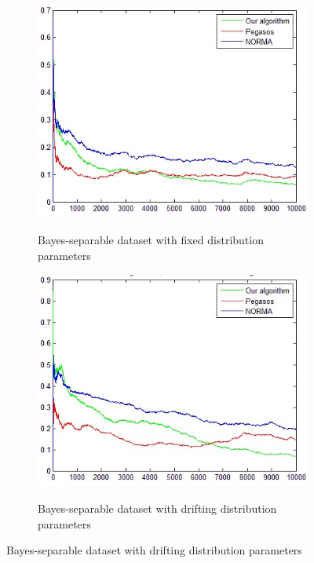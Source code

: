 \begin{figure}[t]
 \begin{subfigure}[c]{.45\linewidth}
	   \includegraphics[width=0.9\linewidth]{PN_Bayess_Gauss}
           \label{BG}
           \caption{Bayes-separable dataset with fixed distribution parameters}
 \end{subfigure}%
\hspace{.01\linewidth}
\begin{subfigure}[c]{.45\linewidth}
    \includegraphics[width=0.9\linewidth]{PN_Move_Gauss}
    \label{MG} 
   \caption{Bayes-separable dataset with drifting distribution parameters}
\end{subfigure}%


\end{figure}
